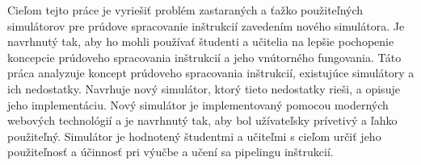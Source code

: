 \bigskip{}


Cieľom tejto práce je vyriešiť problém zastaraných a ťažko použiteľných simulátorov pre prúdove spracovanie inštrukcií zavedením nového simulátora. Je navrhnutý tak, aby ho mohli používať študenti a učitelia na lepšie pochopenie koncepcie prúdoveho spracovania inštrukcií a jeho vnútorného fungovania. Táto práca analyzuje koncept prúdoveho spracovania inštrukcií, existujúce simulátory a ich nedostatky. Navrhuje nový simulátor, ktorý tieto nedostatky rieši, a opisuje jeho implementáciu. Nový simulátor je implementovaný pomocou moderných webových technológií a je navrhnutý tak, aby bol užívateľsky prívetivý a ľahko použiteľný. Simulátor je hodnotený študentmi a učiteľmi s cieľom určiť jeho použiteľnosť a účinnosť pri výučbe a učení sa pipelingu inštrukcií.

\newpage{}\thispagestyle{empty}\medskip{}


\newpage{}


\thispagestyle{empty}
\mbox{}
\newpage

